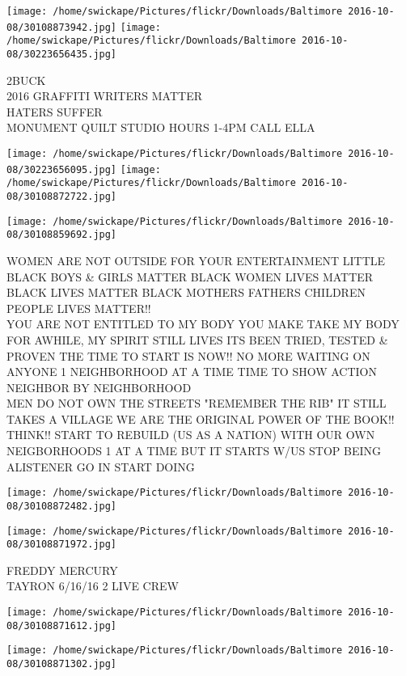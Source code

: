 \documentclass[10pt,letterpaper]{article}
\begin{document}
\texttt{[image: /home/swickape/Pictures/flickr/Downloads/Baltimore 2016-10-08/30108873942.jpg]}
\texttt{[image: /home/swickape/Pictures/flickr/Downloads/Baltimore 2016-10-08/30223656435.jpg]}

2BUCK\\
2016 GRAFFITI WRITERS MATTER\\
HATERS SUFFER\\
MONUMENT QUILT STUDIO HOURS 1{-}4PM CALL ELLA
\pagebreak

\texttt{[image: /home/swickape/Pictures/flickr/Downloads/Baltimore 2016-10-08/30223656095.jpg]}
\texttt{[image: /home/swickape/Pictures/flickr/Downloads/Baltimore 2016-10-08/30108872722.jpg]}

\texttt{[image: /home/swickape/Pictures/flickr/Downloads/Baltimore 2016-10-08/30108859692.jpg]}

WOMEN ARE NOT OUTSIDE FOR YOUR ENTERTAINMENT LITTLE BLACK BOYS \& GIRLS MATTER BLACK WOMEN LIVES MATTER BLACK LIVES MATTER BLACK MOTHERS FATHERS CHILDREN PEOPLE LIVES MATTER!!\\
YOU ARE NOT ENTITLED TO MY BODY YOU MAKE TAKE MY BODY FOR AWHILE, MY SPIRIT STILL LIVES ITS BEEN TRIED, TESTED \& PROVEN THE TIME TO START IS NOW!!  NO MORE WAITING ON ANYONE 1 NEIGHBORHOOD AT A TIME TIME TO SHOW ACTION NEIGHBOR BY NEIGHBORHOOD\\
MEN DO NOT OWN THE STREETS "REMEMBER THE RIB" IT STILL TAKES A VILLAGE WE ARE THE ORIGINAL POWER OF THE BOOK!! THINK!! START TO REBUILD (US AS A NATION) WITH OUR OWN NEIGBORHOODS 1 AT A TIME BUT IT STARTS W/US STOP BEING ALISTENER GO IN START DOING
\pagebreak

\texttt{[image: /home/swickape/Pictures/flickr/Downloads/Baltimore 2016-10-08/30108872482.jpg]}

\vspace{0.25in}
\texttt{[image: /home/swickape/Pictures/flickr/Downloads/Baltimore 2016-10-08/30108871972.jpg]}

FREDDY MERCURY\\
TAYRON 6/16/16 2 LIVE CREW
\pagebreak

\texttt{[image: /home/swickape/Pictures/flickr/Downloads/Baltimore 2016-10-08/30108871612.jpg]}

\vspace{0.25in}
\texttt{[image: /home/swickape/Pictures/flickr/Downloads/Baltimore 2016-10-08/30108871302.jpg]}
\end{document}
